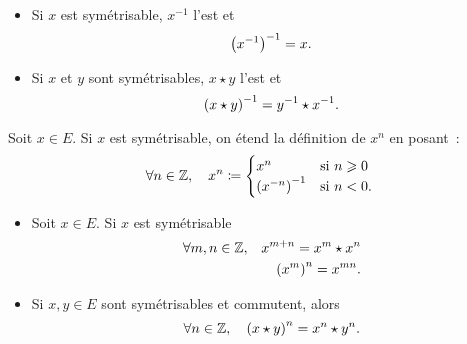 \documentclass{magnolia}
\begin{document}
\begin{proposition}
\begin{itemize}
\item Si $x$ est symétrisable, $x^{-1}$ l'est et
  \[\left(x^{-1}\right)^{-1}=x.\]
\item Si $x$ et $y$ sont symétrisables, $x\star y$ l'est et
  \[\left(x\star y\right)^{-1}=y^{-1}\star x^{-1}.\]  
\end{itemize}
\end{proposition}

\begin{definition}
Soit $x\in E$. Si $x$ est symétrisable, on étend la définition de $x^n$ en posant~:
\[\forall n\in\mathbb{Z} ,\quad x^n\coloneqq
  \begin{cases}
  x^n & \text{si $n\geqslant 0$}\\
  \left(x^{-n}\right)^{-1} & \text{si $n< 0$}.
  \end{cases}\]
\end{definition}

\begin{proposition}
\begin{itemize}
\item Soit $x\in E$. Si $x$ est symétrisable
\begin{eqnarray*}
\forall m,n\in\mathbb{Z}, & & x^{m+n}=x^m\star x^n\\
                 & & \left(x^m\right)^n=x^{mn}.
\end{eqnarray*}
\item Si $x,y\in E$ sont symétrisables et commutent, alors
\[\forall n\in\mathbb{Z} ,\quad \left(x\star y\right)^n=x^n \star y^n.\]
\end{itemize}
\end{proposition}
\end{document}
